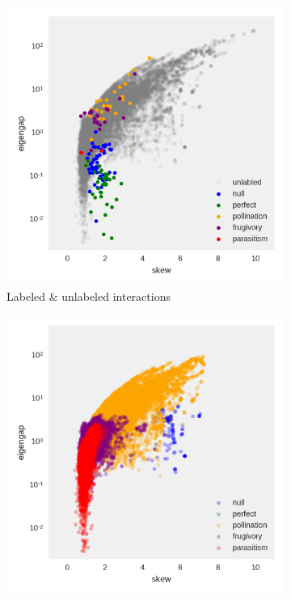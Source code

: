 \begin{figure}
    \centering
    \begin{subfigure}[b]{0.45\textwidth}
        \includegraphics[width=\textwidth]{FishPoo/figures/codiv_literature_fishpoo_classified_skew_eigengap_a.png}
        \caption{Labeled \& unlabeled interactions}
    \end{subfigure}
    \begin{subfigure}[b]{0.45\textwidth}
        \includegraphics[width=\textwidth]{FishPoo/figures/codiv_literature_fishpoo_classified_skew_eigengap_b.png}

\end{subfigure}
\end{figure}
